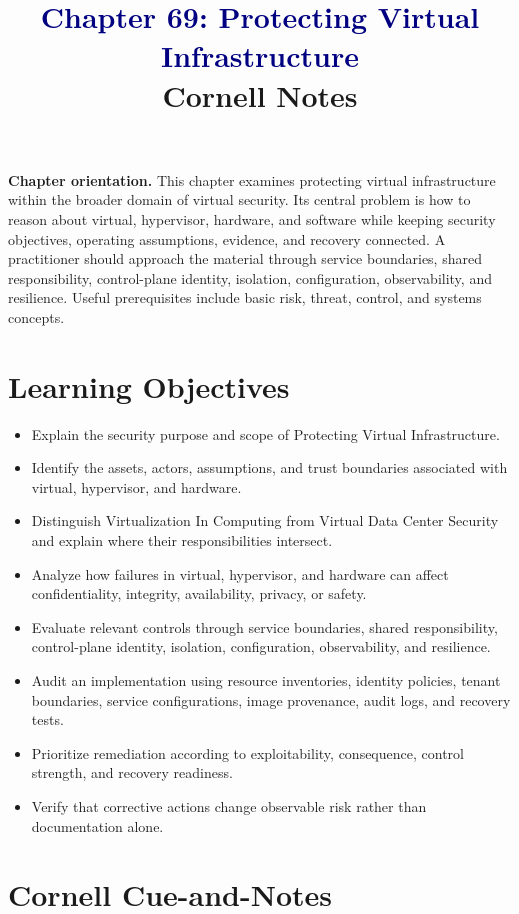 \documentclass[11pt]{article}
\title{\textcolor{Navy}{Chapter 69: Protecting Virtual Infrastructure}\\[2mm]\large Cornell Notes}
\author{}
\date{}
\begin{document}
\maketitle
\thispagestyle{fancy}
\vspace{-1.5em}
\begin{orientationbox}
\textbf{Chapter orientation.} This chapter examines protecting virtual infrastructure within the broader domain of virtual security. Its central problem is how to reason about virtual, hypervisor, hardware, and software while keeping security objectives, operating assumptions, evidence, and recovery connected. A practitioner should approach the material through service boundaries, shared responsibility, control-plane identity, isolation, configuration, observability, and resilience. Useful prerequisites include basic risk, threat, control, and systems concepts.
\end{orientationbox}
\section*{Learning Objectives}
\begin{itemize}
\item Explain the security purpose and scope of Protecting Virtual Infrastructure.
\item Identify the assets, actors, assumptions, and trust boundaries associated with virtual, hypervisor, and hardware.
\item Distinguish Virtualization In Computing from Virtual Data Center Security and explain where their responsibilities intersect.
\item Analyze how failures in virtual, hypervisor, and hardware can affect confidentiality, integrity, availability, privacy, or safety.
\item Evaluate relevant controls through service boundaries, shared responsibility, control-plane identity, isolation, configuration, observability, and resilience.
\item Audit an implementation using resource inventories, identity policies, tenant boundaries, service configurations, image provenance, audit logs, and recovery tests.
\item Prioritize remediation according to exploitability, consequence, control strength, and recovery readiness.
\item Verify that corrective actions change observable risk rather than documentation alone.
\end{itemize}
\section*{Cornell Cue-and-Notes}
\end{document}
